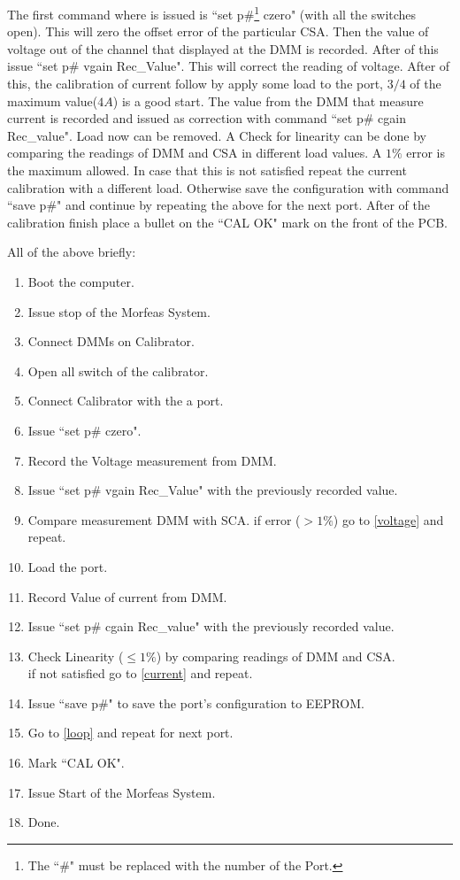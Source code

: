 The first command where is issued is ``set p\#\footnote{The ``\#" must be replaced with the number of the Port.} czero" (with all the switches open).
This will zero the offset error of the particular CSA.
Then the value of voltage out of the channel that displayed at the DMM is recorded.
After of this issue ``set p\# vgain Rec\_Value".
This will correct the reading of voltage.
After of this, the calibration of current follow by apply some load to the port, $3/4$ of the maximum value($4A$) is a good start.
The value from the DMM that measure current is recorded and issued as correction with command ``set p\# cgain Rec\_value".
Load now can be removed. A Check for linearity can be done by comparing the readings of DMM and CSA in different load values.
A $1\%$ error is the maximum allowed.
In case that this is not satisfied repeat the current calibration with a different load.
Otherwise save the configuration with command ``save p\#" and continue by repeating the above for the next port.
After of the calibration finish place a bullet on the ``CAL OK" mark on the front of the PCB.\\
\par\noindent
All of the above briefly:
\begin{enumerate}
	\item Boot the computer.
	\item Issue stop of the Morfeas System.
	\item Connect DMMs on Calibrator.
	\item Open all switch of the calibrator.
	\item Connect Calibrator with the a port.\label{loop}
	\item Issue ``set p\# czero".
	\item Record the Voltage measurement from DMM.\label{voltage}
	\item Issue ``set p\# vgain Rec\_Value" with the previously recorded value.
	\item Compare measurement DMM with SCA. if error ($>1\%$) go to \ref{voltage} and repeat.
	\item Load the port.\label{current}
	\item Record Value of current from DMM.
	\item Issue ``set p\# cgain Rec\_value" with the previously recorded value.
	\item Check Linearity ($\leq1\%$) by comparing readings of DMM and CSA.\\ if not satisfied go to \ref{current} and repeat.
	\item Issue ``save p\#" to save the port's configuration to EEPROM.
	\item Go to \ref{loop} and repeat for next port.
	\item Mark ``CAL OK".
	\item Issue Start of the Morfeas System.
	\item Done.
\end{enumerate}
